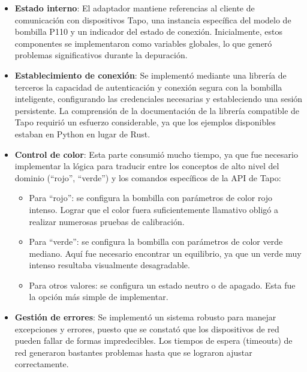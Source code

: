 \begin{itemize}
    \item \textbf{Estado interno}: El adaptador mantiene referencias al cliente de comunicación con dispositivos Tapo, una instancia específica del modelo de bombilla P110 y un indicador del estado de conexión. Inicialmente, estos componentes se implementaron como variables globales, lo que generó problemas significativos durante la depuración.
    
    \item \textbf{Establecimiento de conexión}: Se implementó mediante una librería de terceros la capacidad de autenticación y conexión segura con la bombilla inteligente, configurando las credenciales necesarias y estableciendo una sesión persistente. La comprensión de la documentación de la librería compatible de Tapo requirió un esfuerzo considerable, ya que los ejemplos disponibles estaban en Python en lugar de Rust.
    
    \item \textbf{Control de color}: Esta parte consumió mucho tiempo, ya que fue necesario implementar la lógica para traducir entre los conceptos de alto nivel del dominio (\textquotedblleft rojo\textquotedblright{}, \textquotedblleft verde\textquotedblright{}) y los comandos específicos de la API de Tapo:
    \begin{itemize}
        \item Para \textquotedblleft rojo\textquotedblright{}: se configura la bombilla con parámetros de color rojo intenso. Lograr que el color fuera suficientemente llamativo obligó a realizar numerosas pruebas de calibración.
        \item Para \textquotedblleft verde\textquotedblright{}: se configura la bombilla con parámetros de color verde mediano. Aquí fue necesario encontrar un equilibrio, ya que un verde muy intenso resultaba visualmente desagradable.
        \item Para otros valores: se configura un estado neutro o de apagado. Esta fue la opción más simple de implementar.
    \end{itemize}
    
    \item \textbf{Gestión de errores}: Se implementó un sistema robusto para manejar excepciones y errores, puesto que se constató que los dispositivos de red pueden fallar de formas impredecibles. Los tiempos de espera (timeouts) de red generaron bastantes problemas hasta que se lograron ajustar correctamente.
\end{itemize}

